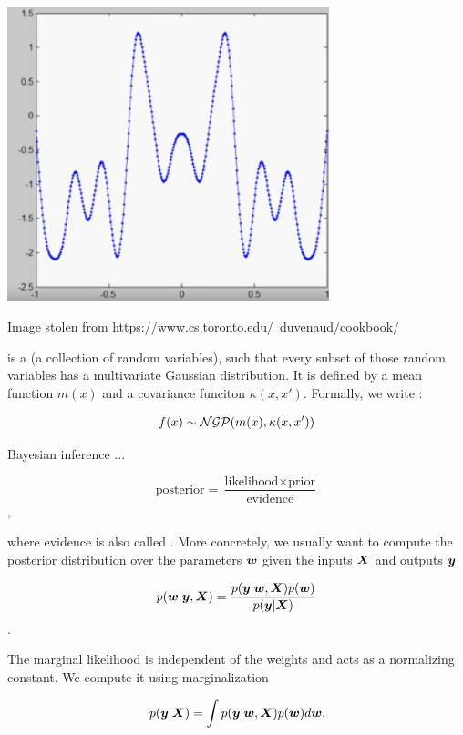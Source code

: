 \includegraphics[width=0.7\textwidth]{img/symmetric-kernel}

Image stolen from https://www.cs.toronto.edu/~duvenaud/cookbook/


\begin{tcolorbox}
     is a  (a collection of random variables), such that every subset of those random variables has a multivariate Gaussian distribution. It is defined by a mean function $m(x)$ and a covariance funciton $\kappa(x, x')$. Formally, we write :
    
    \begin{equation}
    f(x) \sim {\mathcal{N}} {\mathcal{G}} {\mathcal{P}} (m(x), \kappa(x, x'))
    \end{equation} 
    
    Bayesian inference ...
    
    \begin{equation}
        \text{posterior} = \frac{\text{likelihood} \times \text{prior}}{\text{evidence}}
    \end{equation},
    
    where evidence is also called . More concretely, we usually want to compute the posterior distribution over the parameters ${\bm{w}}$ given the inputs ${\bm{X}}$ and outputs ${\bm{y}}$
    
    \begin{equation}
        p({\bm{w}} | {\bm{y}}, {\bm{X}}) = \frac{p({\bm{y}} | {\bm{w}}, {\bm{X}}) p({\bm{w}})}{p({\bm{y}} | {\bm{X}})}
    \end{equation}.
    
    The marginal likelihood is independent of the weights and acts as a normalizing constant. We compute it using marginalization
    
    \begin{equation}
        p({\bm{y}} | {\bm{X}}) = \int p({\bm{y}} | {\bm{w}}, {\bm{X}}) p({\bm{w}}) d {\bm{w}}.
    \end{equation}
    
\end{tcolorbox}


